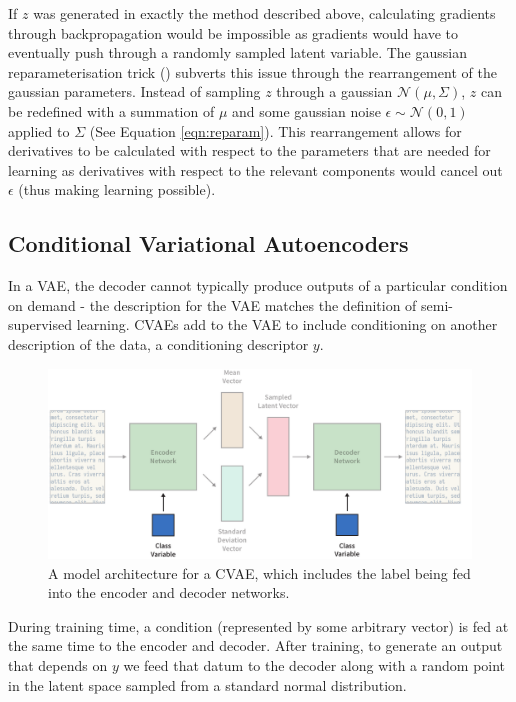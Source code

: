\documentclass[12pt,twoside]{report}
\begin{document}
If $z$ was generated in exactly the method described above, calculating gradients through backpropagation would be impossible as gradients would have to eventually push through a randomly sampled latent variable. The gaussian reparameterisation trick (\cite{kingma_auto-encoding_2013}) subverts this issue through the rearrangement of the gaussian parameters. Instead of sampling $z$ through a gaussian $\mathcal{N}(\mu, \Sigma)$, $z$ can be redefined with a summation of $\mu$ and some gaussian noise $\epsilon \sim \mathcal{N}(0,1)$ applied to $\Sigma$ (See Equation \ref{eqn:reparam}). This rearrangement allows for derivatives to be calculated with respect to the parameters that are needed for learning as derivatives with respect to the relevant components would cancel out $\epsilon$ (thus making learning possible).

\subsection{Conditional Variational Autoencoders}
\label{conditional_variational_autoencoders}
In a VAE, the decoder cannot typically produce outputs of a particular condition on demand - the description for the VAE matches the definition of semi-supervised learning. CVAEs add to the VAE to include conditioning on another description of the data, a conditioning descriptor $y$. 

\begin{figure}[!ht]
	\centering
	\includegraphics[width=150mm]{diagrams/conditional_variational_autoencoders.pdf}
	\caption{A model architecture for a CVAE, which includes the label being fed into the encoder and decoder networks. \label{cvae_diagram}}
\end{figure}

During training time, a condition (represented by some arbitrary vector) is fed at the same time to the encoder and decoder. After training, to generate an output that depends on $y$ we feed that datum to the decoder along with a random point in the latent space sampled from a standard normal distribution.
\end{document}
